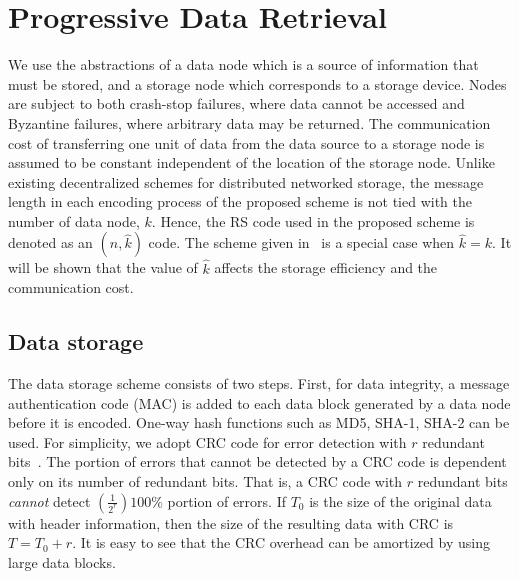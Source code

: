 \documentclass[10pt,journal,letterpaper,compsoc]{IEEEtran}
\newcommand{\0}{{\bf 0}}
\newcounter{step}
\begin{document}
\section{Progressive Data Retrieval}
\label{sect:progressive}
We use the abstractions of a data node which is a source of information that
must be stored, and a storage node which corresponds to a storage device.
Nodes are subject to both crash-stop failures, where data cannot be accessed
and Byzantine failures, where arbitrary data may be returned.  The
communication cost of transferring one unit of data from the data source to a
storage node is assumed to be constant independent of the location of the
storage node.
Unlike existing decentralized schemes for distributed networked storage, the message length in each encoding process of the proposed scheme is not tied with the number of data  node, $k$. Hence, the RS code used in the proposed scheme is denoted as an $(n,\hat{k})$ code. The scheme given in~\cite{Han10-Infocom} is a special case when $\hat{k}=k$. It will be shown that the value of $\hat{k}$ affects the storage efficiency and the communication cost.
\subsection{Data storage}
\label{sect:data_storage}
The data storage scheme consists of two steps. First, for data integrity, a
message authentication code (MAC) is added to each data block generated by a data node
before it is encoded. One-way hash functions such as MD5, SHA-1, SHA-2 can
be used. For simplicity, we adopt  CRC code for error detection with $r$
redundant bits~\cite{MOO05,REE99}. The portion of
errors that cannot be detected by a CRC code is dependent only on its number of
redundant bits. That is, a CRC code with $r$ redundant bits {\it cannot} detect
$(\frac{1}{2^r})100\%$ portion of errors.  If $T_0$ is the size of the original data with header information, then the size of the resulting data with CRC is $T = T_0 + r$. It is easy to see that the CRC overhead can be amortized by using large data blocks.  
\end{document}
